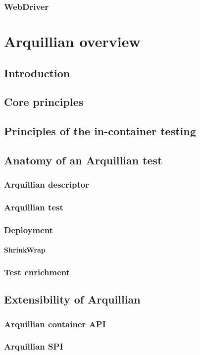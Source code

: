 \documentclass[12pt,final,oneside]{fithesis}
\begin{document}
		\subsection{WebDriver}

\chapter{Arquillian overview}
	\section{Introduction}
	\section{Core principles}
	\section{Principles of the in-container testing}
	\section{Anatomy of an Arquillian test}
		\subsection{Arquillian descriptor}
		\subsection{Arquillian test}
		\subsection{Deployment}
			\subsubsection{ShrinkWrap}
		\subsection{Test enrichment}
	\section{Extensibility of Arquillian}
		\subsection{Arquillian container API}
		\subsection{Arquillian SPI}
\end{document}
